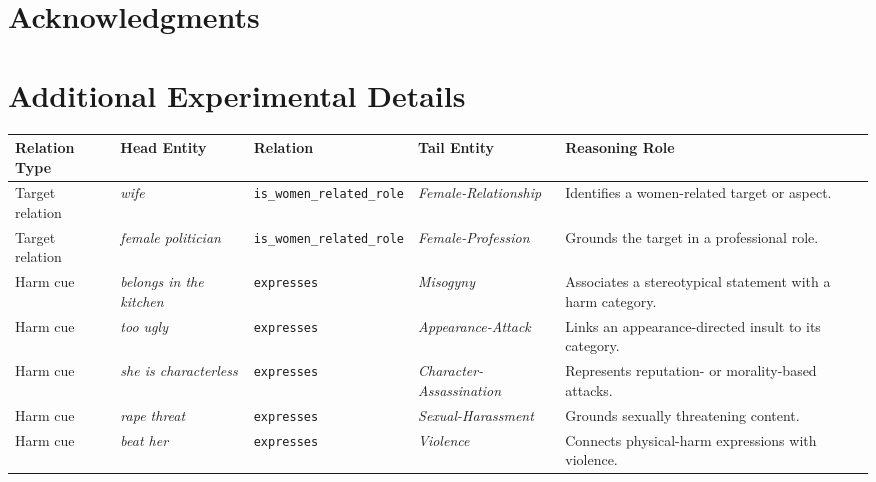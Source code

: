 \documentclass[11pt]{article}
\begin{document}
\section*{Acknowledgments}



%


\appendix

\section{Additional Experimental Details}
\label{sec:appendix}
\begin{table}[t]
\centering
\small
\setlength{\tabcolsep}{4.5pt}
\renewcommand{\arraystretch}{1.08}
\begin{tabular}{p{2.1cm}p{2.8cm}p{3.2cm}p{3.0cm}p{3.3cm}}
\toprule
\textbf{Relation Type} &
\textbf{Head Entity} &
\textbf{Relation} &
\textbf{Tail Entity} &
\textbf{Reasoning Role} \\
\midrule

Target relation
& \textit{wife}
& \texttt{is\_women\_related\_role}
& \textit{Female-Relationship}
& Identifies a women-related target or aspect. \\

Target relation
& \textit{female politician}
& \texttt{is\_women\_related\_role}
& \textit{Female-Profession}
& Grounds the target in a professional role. \\

Harm cue
& \textit{belongs in the kitchen}
& \texttt{expresses}
& \textit{Misogyny}
& Associates a stereotypical statement with a harm category. \\

Harm cue
& \textit{too ugly}
& \texttt{expresses}
& \textit{Appearance-Attack}
& Links an appearance-directed insult to its category. \\

Harm cue
& \textit{she is characterless}
& \texttt{expresses}
& \textit{Character-Assassination}
& Represents reputation- or morality-based attacks. \\

Harm cue
& \textit{rape threat}
& \texttt{expresses}
& \textit{Sexual-Harassment}
& Grounds sexually threatening content. \\

Harm cue
& \textit{beat her}
& \texttt{expresses}
& \textit{Violence}
& Connects physical-harm expressions with violence. \\


\end{tabular}
\end{table}
\end{document}

